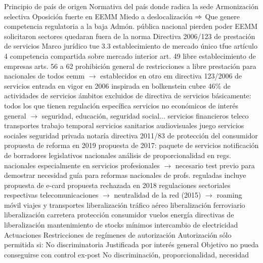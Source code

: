 \documentclass{nuevotema}
\begin{document}
\begin{esquemal}
				\4 Principio de país de origen
				\4[] Normativa del país donde radica la sede
				\4 Armonización selectiva
				\4 Oposición fuerte en EEMM
				\4[] Miedo a deslocalización
				\4[] $\then$ Que genere competencia regulatoria a la baja
				\4[] Admón. pública nacional pierden poder
				\4 EEMM solicitaron sectores quedaran fuera de la norma
			\3 Directiva 2006/123 de prestación de servicios
		\2 Marco jurídico
			\3 tue 3.3
				\4 establecimiento de mercado único
			\3 tfue
				\4 artículo 4
				\4[] competencia compartida sobre mercado interior
				\4 art. 49
				\4[] libre establecimiento de empresas
				\4 arts. 56 a 62
				\4[]prohibición general de restricciones a libre prestación
				\4[] para nacionales de todos eemm
				\4[] $\to$ establecidos en otro em
			\3 directiva 123/2006 de servicios
				\4 entrada en vigor en 2006
				\4 inspirada en bolkenstein
				\4 cubre 46\% de actividades de servicios
			\3 ámbitos excluidos de directiva de servicios
				\4 básicamente:
				\4[] todos los que tienen regulación específica
				\4[] servicios no económicos de interés general
				\4[] $\to$ seguridad, educación, seguridad social...
				\4 servicios financieros
				\4 teleco
				\4 transportes
				\4 trabajo temporal
				\4 servicios sanitarios
				\4 audiovisuales
				\4 juego
				\4 servicios sociales
				\4 seguridad privada
				\4 notaría
			\3 directiva 2011/83 de protección del consumidor
				\4 propuesta de reforma en 2019
			\3 propuesta de 2017: paquete de servicios
				\4 notificación de borradores legislativos nacionales
				\4 análisis de proporcionalidad en regs. nacionales
				\4[] especialmente en servicios profesionales
				\4[] $\to$ necesario test previo para demostrar necesidad
				\4 guía para reformas nacionales de profs. reguladas
				\4 incluye propuesta de e-card
				\4 propuesta rechazada en 2018
			\3 regulaciones sectoriales respectivas
				\4 telecomunicaciones
				\4[] $\to$ neutralidad de la red (2015)
				\4[] $\to$ roaming móvil
				\4 viajes y transportes
				\4[] liberalización tráfico aéreo
				\4[] liberalización ferroviario
				\4[] liberalización carretera
				\4[] protección consumidor vuelos
				\4 energía
				\4[] directivas de liberalización
				\4[] mantenimiento de stocks mínimos
				\4[] intercambio de electricidad
		\2 Actuaciones
			\3 Restricciones de regímenes de autorización
				\4 Autorización sólo permitida si:
				\4[] No discriminatoria
				\4[] Justificada por interés general
				\4[] Objetivo no pueda conseguirse con control ex-post
				\4[$\then$] No discriminación, proporcionalidad, necesidad

\end{esquemal}
\end{document}
